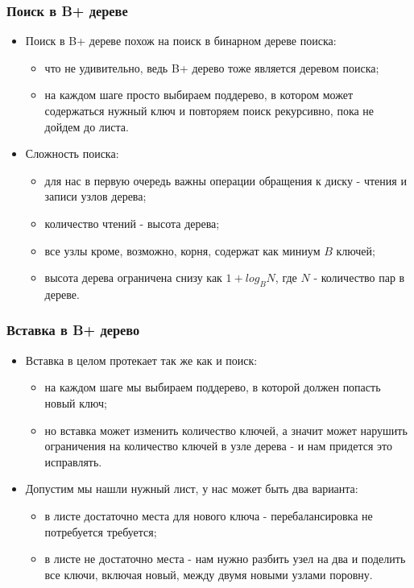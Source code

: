 \begin{frame}
\frametitle{Поиск в B+ дереве}
\begin{itemize}
  \item Поиск в B+ дереве похож на поиск в бинарном дереве поиска:
  \begin{itemize}
    \item что не удивительно, ведь B+ дерево тоже является деревом поиска;
    \item на каждом шаге просто выбираем поддерево, в котором может
    содержаться нужный ключ и повторяем поиск рекурсивно, пока не дойдем до
    листа.
  \end{itemize}
  \item Сложность поиска:
  \begin{itemize}
    \item для нас в первую очередь важны операции обращения к диску - чтения
    и записи узлов дерева;
    \item количество чтений - высота дерева;
    \item все узлы кроме, возможно, корня, содержат как миниум $B$ ключей;
    \item высота дерева ограничена снизу как $1 + log_B N$, где $N$ -
    количество пар в дереве.
  \end{itemize}
\end{itemize}
\end{frame}

\begin{frame}
\frametitle{Вставка в B+ дерево}
\begin{itemize}
  \item Вставка в целом протекает так же как и поиск:
  \begin{itemize}
    \item на каждом шаге мы выбираем поддерево, в которой должен попасть
    новый ключ;
    \item но вставка может изменить количество ключей, а значит может
    нарушить ограничения на количество ключей в узле дерева - и нам придется
    это исправлять.
  \end{itemize}
  \item Допустим мы нашли нужный лист, у нас может быть два варианта:
  \begin{itemize}
    \item в листе достаточно места для нового ключа - перебалансировка не
    потребуется требуется;
    \item в листе не достаточно места - нам нужно разбить узел на два и
    поделить все ключи, включая новый, между двумя новыми узлами поровну.
  \end{itemize}
\end{itemize}
\end{frame}

